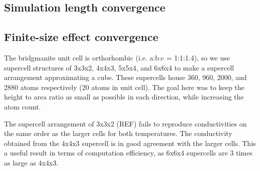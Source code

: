 \subsection{\label{sec:3.GK.sim}Simulation length convergence}



\subsection{\label{sec:3.GK.fse}Finite-size effect convergence}

The bridgmanite unit cell is orthorhombic (i.e. a:b:c = 1:1:1.4), so we use supercell structures of 3x3x2, 4x4x3, 5x5x4, and 6x6x4 to make a supercell arrangement approximating a cube. These supercells house 360, 960, 2000, and 2880 atoms respectively (20 atoms in unit cell). The goal here was to keep the height to area ratio as small as possible in each direction, while increasing the atom count.

The supercell arrangement of 3x3x2 (REF) fails to reproduce conductivities on the same order as the larger cells for both temperatures. 
The conductivity obtained from the 4x4x3 supercell is in good agreement with the larger cells. This a useful result in terms of computation efficiency, as 6x6x4 supercells are 3 times as large as 4x4x3.

